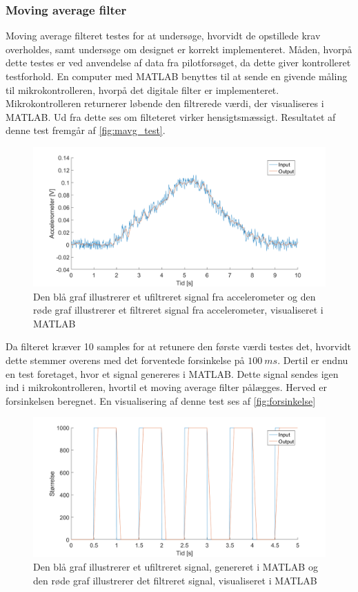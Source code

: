 \subsubsection{Moving average filter}
Moving average filteret testes for at undersøge, hvorvidt de opstillede krav overholdes, samt undersøge om designet er korrekt implementeret. Måden, hvorpå dette testes er ved anvendelse af data fra pilotforsøget, da dette giver kontrolleret testforhold. 
En computer med MATLAB benyttes til at sende en givende måling til mikrokontrolleren, hvorpå det digitale filter er implementeret. Mikrokontrolleren returnerer løbende den filtrerede værdi, der visualiseres i MATLAB. Ud fra dette ses om filteteret virker hensigtsmæssigt. 
Resultatet af denne test fremgår af \autoref{fig:mavg_test}. 

\begin{figure}[H]
	\centering
	\includegraphics[width=1\textwidth]{figures/accelerometer_filter}
	\caption{Den blå graf illustrerer et ufiltreret signal fra accelerometer og den røde graf illustrerer et filtreret signal fra accelerometer, visualiseret i MATLAB}
	\label{fig:mavg_test}
\end{figure}

\noindent
Da filteret kræver 10 samples for at retunere den første værdi testes det, hvorvidt dette stemmer overens med det forventede forsinkelse på $100~ms$. Dertil er endnu en test foretaget, hvor et signal genereres i MATLAB. Dette signal sendes igen ind i mikrokontrolleren, hvortil et moving average filter pålægges. Herved er forsinkelsen beregnet. En visualisering af denne test ses af \autoref{fig:forsinkelse}

\begin{figure}[H]
	\centering
	\includegraphics[width=1\textwidth]{figures/forsinkelse}
	\caption{Den blå graf illustrerer et ufiltreret signal, genereret i MATLAB og den røde graf illustrerer det filtreret signal, visualiseret i MATLAB}
	\label{fig:forsinkelse}
\end{figure}

